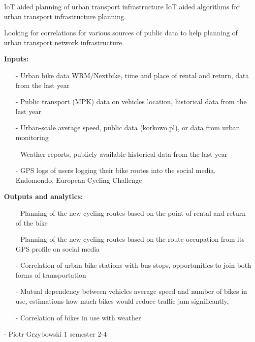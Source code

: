 \begin{project}
{IoT aided planning of urban transport infrastructure}
{IoT aided algorithms for urban transport infrastructure planning.} 
{ 
Looking for correlations for various sources of public data to help planning of urban transport network infrastructure.

\textbf{Inputs:}
\begin{itemize}
	\item[-] Urban bike data WRM/Nextbike, time and place of rental and return, data from the last year
	\item[-] Public transport (MPK) data on vehicles location, historical data from the last year
	\item[-] Urban-scale average speed, public data (korkowo.pl), or data from urban monitoring
	\item[-] Weather reports, publicly available historical data from the last year
	\item[-] GPS logs of users logging their bike routes into the social media, Endomondo, European Cycling Challenge
\end{itemize} 
\textbf{Outputs and analytics:}
\begin{itemize}
	\item[-] Planning of the new cycling routes based on the point of rental and return of the bike
	\item[-] Planning of the new cycling routes based on the route occupation from its  GPS profile on social media
	\item[-] Correlation of urban bike stations with bus stops, opportunities to join both forms of transportation
	\item[-] Mutual dependency between vehicles average speed and number of bikes in use, estimations how much bikes would reduce traffic jam significantly,
	\item[-] Correlation of bikes in use with weather 
\end{itemize} 
}
{-}
{Piotr Grzybowski}
{1 semester}
{2-4}
\end{project}
